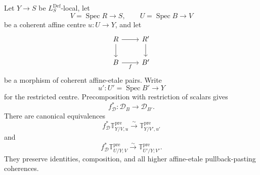 \begin{proposition}
\label{prop:bnla-pre-tangent-cartesian-family}
Let $Y\to S$ be $L^{\mathrm{Def}}_S$-local, let
\[
    V=\operatorname{Spec}R\longrightarrow S,
    \qquad
    U=\operatorname{Spec}B\longrightarrow V
\]
be a coherent affine centre $u:U\to Y$, and let
\[
\begin{tikzcd}
R \arrow[r] \arrow[d] & R' \arrow[d]\\
B \arrow[r,"f"'] & B'
\end{tikzcd}
\]
be a morphism of coherent affine-etale pairs.  Write
\[
    u':U'=\operatorname{Spec}B'\longrightarrow Y
\]
for the restricted centre.  Precomposition with restriction of scalars gives
\[
    f_{\mathcal D}^*:
    \mathcal D_B\longrightarrow\mathcal D_{B'}.
\]
There are canonical equivalences
\[
\boxed{
    f_{\mathcal D}^*
    \mathbb T^{\mathrm{pre}}_{Y/V,u}
    \xrightarrow{\sim}
    \mathbb T^{\mathrm{pre}}_{Y/V',u'}}
\]
and
\[
\boxed{
    f_{\mathcal D}^*
    \mathbb T^{\mathrm{pre}}_{U/Y;V}
    \xrightarrow{\sim}
    \mathbb T^{\mathrm{pre}}_{U'/Y;V'}.}
\]
They preserve identities, composition, and all higher affine-etale
pullback-pasting coherences.
\end{proposition}

